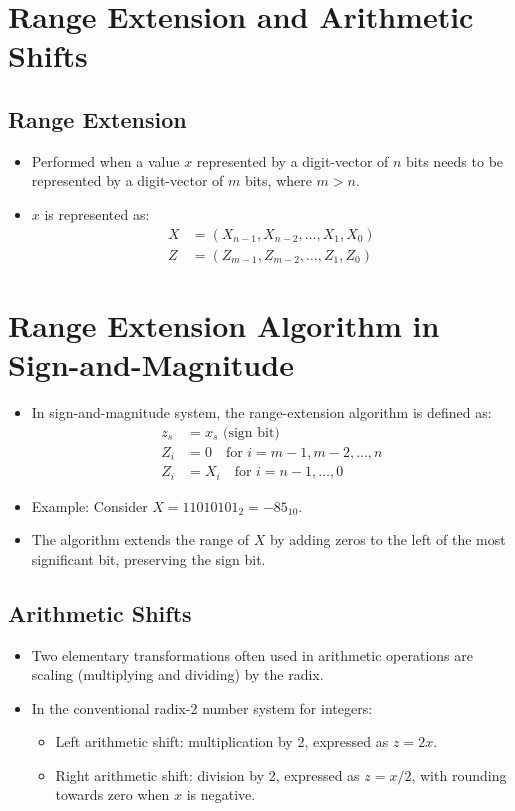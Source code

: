 \documentclass[12pt,openany, tikz,border=10pt]{book}
\begin{document}
	\section{Range Extension and Arithmetic Shifts}
	\subsection{Range Extension}
	
	\begin{itemize}
		\item[] Performed when a value \( x \) represented by a digit-vector of \( n \) bits needs to be represented by a digit-vector of \( m \) bits, where \( m > n \).
		\item[] \( x \) is represented as:
			  \begin{align*}
				  X & = (X_{n-1}, X_{n-2}, \ldots, X_1, X_0) \\
				  Z & = (Z_{m-1}, Z_{m-2}, \ldots, Z_1, Z_0) 
			  \end{align*}
	\end{itemize}
	
	\small \section{Range Extension Algorithm in Sign-and-Magnitude}
	\begin{itemize}
		\item[] In sign-and-magnitude system, the range-extension algorithm is defined as:
			  \begin{align*}
				  z_s & = x_s \text{ (sign bit)}                          \\
				  Z_i & = 0 \quad \text{for } i = m - 1, m - 2, \ldots, n \\
				  Z_i & = X_i \quad \text{for } i = n - 1, \ldots, 0      
			  \end{align*}
		\item[] Example: Consider \( X = 11010101_2 = -85_{10} \).
		\item[] The algorithm extends the range of \( X \) by adding zeros to the left of the most significant bit, preserving the sign bit.
	\end{itemize}
	
	
	\subsection{Arithmetic Shifts}
	
	\begin{itemize}
		\item[] Two elementary transformations often used in arithmetic operations are scaling (multiplying and dividing) by the radix.
		\item[] In the conventional radix-2 number system for integers:
			  \begin{itemize}
				  \item[] Left arithmetic shift: multiplication by 2, expressed as \( z = 2x \).
				  \item[] Right arithmetic shift: division by 2, expressed as \( z = x/2 \), with rounding towards zero when \( x \) is negative.
			  \end{itemize}
	\end{itemize}
	
\end{document}

